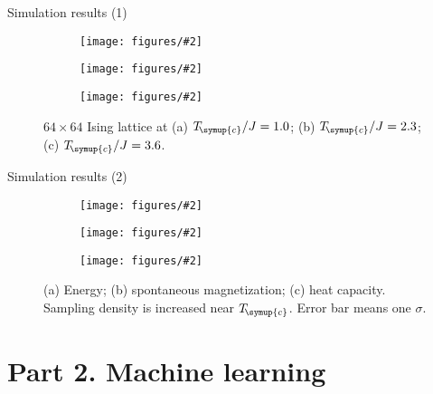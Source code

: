 \documentclass[aspectratio=169]{beamer}
\def\Tc{T_{\!\symup{c}}}
\newcommand\imageinput[2][]{\texttt{[image: figures/\#2]}}
\begin{document}
\begin{frame}{Simulation results (1)}
\begin{figure}
  \centering
  \begin{subfigure}[b]{0.32\textwidth}
    \centering
    \imageinput[width=3cm]{ising-lattice-1-0.pdf}
    \caption{}
  \end{subfigure}
  \begin{subfigure}[b]{0.32\textwidth}
    \centering
    \imageinput[width=3cm]{ising-lattice-2-3.pdf}
    \caption{}
  \end{subfigure}
  \begin{subfigure}[b]{0.32\textwidth}
    \centering
    \imageinput[width=3cm]{ising-lattice-3-6.pdf}
    \caption{}
  \end{subfigure}
  \caption{$64 \times 64$ Ising lattice at (a) $\Tc/J=1.0$; (b) $\Tc/J=2.3$; (c) $\Tc/J=3.6$.}
\end{figure}
\end{frame}

\begin{frame}{Simulation results (2)}
\begin{figure}
  \centering
  \begin{subfigure}[b]{0.32\textwidth}
    \centering
    \imageinput[height=3.4cm]{ising-energy}
  \end{subfigure}
  \begin{subfigure}[b]{0.32\textwidth}
    \centering
    \imageinput[height=3.4cm]{ising-magnet}
  \end{subfigure}
  \begin{subfigure}[b]{0.32\textwidth}
    \centering
    \imageinput[height=3.4cm]{ising-cv}
  \end{subfigure}
  \caption{(a) Energy; (b) spontaneous magnetization; (c) heat capacity.
    Sampling density is increased near $\Tc$. Error bar means one $\sigma$.}
\end{figure}
\end{frame}

\section{Part 2. Machine learning}
\end{document}
